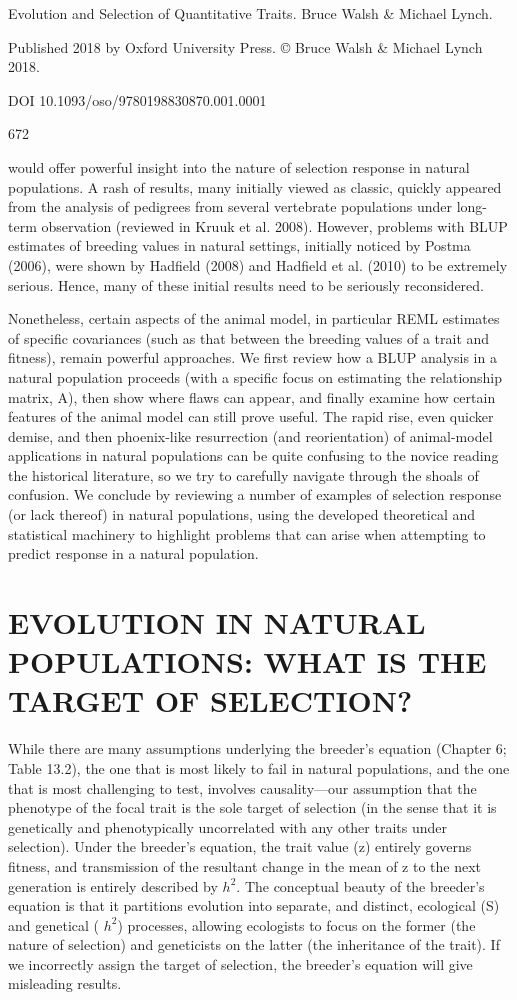 \documentclass{article}
\begin{document}
Evolution and Selection of Quantitative Traits. Bruce Walsh & Michael Lynch.

Published 2018 by Oxford University Press. © Bruce Walsh & Michael Lynch 2018.

DOI 10.1093/oso/9780198830870.001.0001

672

would offer powerful insight into the nature of selection response in natural populations. A rash of results, many initially viewed as classic, quickly appeared from the analysis of pedigrees from several vertebrate populations under long-term observation (reviewed in Kruuk et al. 2008). However, problems with BLUP estimates of breeding values in natural settings, initially noticed by Postma (2006), were shown by Hadfield (2008) and Hadfield et al. (2010) to be extremely serious. Hence, many of these initial results need to be seriously reconsidered.

Nonetheless, certain aspects of the animal model, in particular REML estimates of specific covariances (such as that between the breeding values of a trait and fitness), remain powerful approaches. We first review how a BLUP analysis in a natural population proceeds (with a specific focus on estimating the relationship matrix, A), then show where flaws can appear, and finally examine how certain features of the animal model can still prove useful. The rapid rise, even quicker demise, and then phoenix-like resurrection (and reorientation) of animal-model applications in natural populations can be quite confusing to the novice reading the historical literature, so we try to carefully navigate through the shoals of confusion. We conclude by reviewing a number of examples of selection response (or lack thereof) in natural populations, using the developed theoretical and statistical machinery to highlight problems that can arise when attempting to predict response in a natural population.

\section{EVOLUTION IN NATURAL POPULATIONS: WHAT IS THE TARGET OF SELECTION?}
While there are many assumptions underlying the breeder’s equation (Chapter 6; Table 13.2), the one that is most likely to fail in natural populations, and the one that is most challenging to test, involves causality—our assumption that the phenotype of the focal trait is the sole target of selection (in the sense that it is genetically and phenotypically uncorrelated with any other traits under selection). Under the breeder’s equation, the trait value (z) entirely governs fitness, and transmission of the resultant change in the mean of z to the next generation is entirely described by  $ h^{2} $. The conceptual beauty of the breeder’s equation is that it partitions evolution into separate, and distinct, ecological (S) and genetical ( $ h^{2} $) processes, allowing ecologists to focus on the former (the nature of selection) and geneticists on the latter (the inheritance of the trait). If we incorrectly assign the target of selection, the breeder’s equation will give misleading results.
\end{document}
